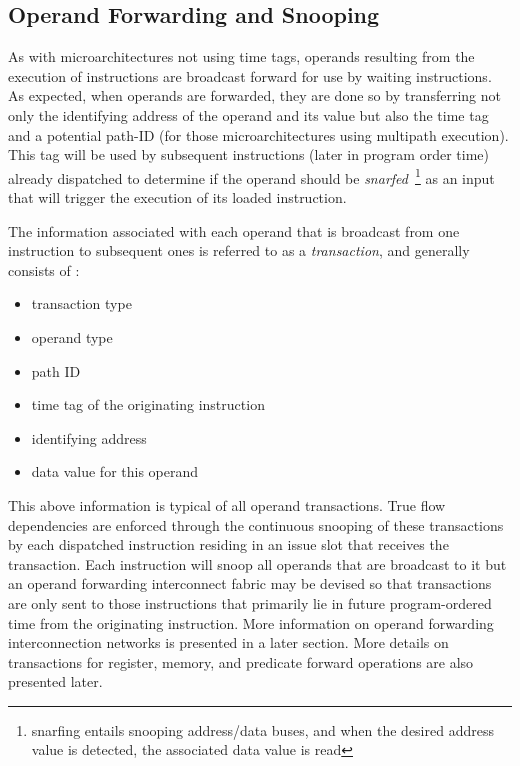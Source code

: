 \documentclass[10pt,dvips]{article}
\begin{document}
\subsection{Operand Forwarding and Snooping}
%
As with microarchitectures not using time tags,
operands resulting from the execution of instructions
are broadcast forward for use by waiting instructions.
As expected, when operands are forwarded, they are done so
by transferring not only the identifying address of the operand
and its value but also the time tag and a potential path-ID (for
those microarchitectures using multipath execution).
This tag will be used by subsequent 
instructions 
(later in program order time)
already dispatched
to determine if
the operand should be {\em snarfed}~\footnote{snarfing entails snooping
address/data buses, and when the desired address value is detected, 
the associated data value is read} 
as an input that will trigger
the execution of its loaded instruction.

The information associated with each operand that is
broadcast from one instruction to subsequent ones
is referred
to as a {\em transaction}, and generally consists of :
%
\begin{itemize}
\vspace{-0.05in}
\item{transaction type}
\vspace{-0.05in}
\item{operand type}
\vspace{-0.05in}
\item{path ID}
\vspace{-0.05in}
\item{time tag of the originating instruction}
\vspace{-0.05in}
\item{identifying address}
\vspace{-0.05in}
\item{data value for this operand}
\vspace{-0.05in}
\end{itemize}   
%
This above information is typical of all operand transactions.
True flow dependencies are enforced through the continuous snooping of
these transactions by each dispatched instruction residing in an issue
slot that receives the transaction.
Each instruction
will snoop all operands that are broadcast to it but
an operand forwarding interconnect fabric may be devised so that
transactions are only sent to those instructions that primarily
lie in future program-ordered time from the originating instruction.  
More information on operand forwarding interconnection networks
is presented in a later section.
More details on transactions for register, memory, and
predicate forward operations are also presented later.
\end{document}
